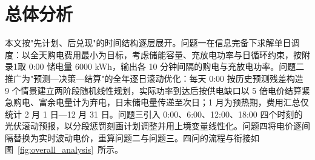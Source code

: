 
\section{总体分析}

本文按"先计划、后兑现"的时间结构逐层展开。问题一在信息完备下求解单日调度：以全天购电费用最小为目标，考虑储能容量、充放电功率与日循环约束，按附录1取 0:00 储电量 6000 kWh，输出各 10 分钟间隔的购电与充放电功率。问题二推广为"预测—决策—结算"的全年逐日滚动优化：每天 0:00 按历史预测残差构造 9 个情景建立两阶段随机线性规划，实际功率到达后按供电缺口以 5 倍电价结算紧急购电、富余电量计为弃电，日末储电量传递至次日；1 月为预热期，费用汇总仅统计 2 月 1 日—12 月 31 日。问题三引入 0:00、6:00、12:00、18:00 四个时刻的光伏滚动预报，以分段惩罚刻画计划调整并用上境变量线性化。问题四将电价逐间隔替换为实时波动电价，重算问题二与问题三。四问的流程与衔接如图~\ref{fig:overall_analysis}~所示。

